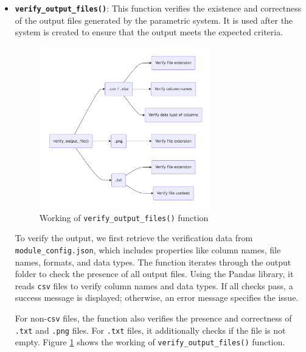 \begin{itemize}
  \item \textbf{\texttt{verify\_output\_files()}}:
  This function verifies the existence and correctness of the output files generated by the parametric system. It is used after the system is created to ensure 
  that the output meets the expected criteria.
  \begin{figure}[!ht]
    \centering
    \includegraphics[width=0.7\textwidth]{Images/verify_output_file.pdf}
    \caption{Working of \texttt{verify\_output\_files()} function}
    \label{verify_output_files}
  \end{figure}
  
  To verify the output, we first retrieve the verification data from \texttt{module\_config.json}, which includes properties like column names, file names, 
  formats, and data types. The function iterates through the output folder to check the presence of all output files. Using the Pandas library, it reads 
  \texttt{csv} files to verify column names and data types. If all checks pass, a success message is displayed; otherwise, an error message specifies the issue.

  For non-\texttt{csv} files, the function also verifies the presence and correctness of \texttt{.txt} and \texttt{.png} files. For \texttt{.txt} files, it 
  additionally checks if the file is not empty. Figure \ref{verify_output_files} shows the working of \texttt{verify\_output\_files()} function.
\end{itemize}

